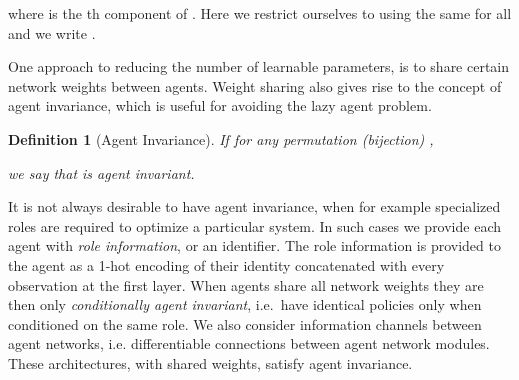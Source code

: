 \documentclass{article}
\newtheorem{definition}{Definition}
\begin{document}
\begin{SCfigure}
where  is the th component of . Here we restrict ourselves to using the same  for all  and we write .
\fi

\iffalse
\paradot{Putting together a scoring function}
Interesting options for the scoring function  are defined by several component functions. We let  be a function applied directly on each agent's observation stream and can represent using low level vision processing like one or two neural network layers that can e.g.\ be linear or convolutional but could also contain a recurrent layer. We also consider a centralization function  that combines all the processed inputs. Then we complete the definition of the scoring function by letting the th component of  be 

where for each  the function . 
\fi






One approach to reducing the number of learnable parameters, is to share certain network weights between agents.
Weight sharing also gives rise to the concept of agent invariance, which is useful for avoiding the lazy agent problem.

\begin{definition}[Agent Invariance]
If for any permutation (bijection) , 

we say that  is \emph{agent invariant}. 
\end{definition}

It is not always desirable to have agent invariance, when for example specialized roles are required to optimize a particular system. In such cases we provide each agent with \emph{role information}, or an identifier. The role information is provided to the agent as a 1-hot encoding of their identity concatenated with every observation at the first layer. When agents share all network weights they are then only \emph{conditionally agent invariant}, i.e.\ have identical policies only when conditioned on the same role. We also consider information channels between agent networks, i.e. differentiable connections between agent network modules. These architectures, with shared weights, satisfy agent invariance.

 

\end{SCfigure}
\end{document}
